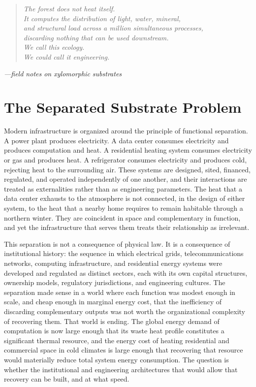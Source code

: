 \documentclass[12pt, oneside]{article}
\begin{document}
\begin{quote}
\small\itshape
The forest does not heat itself.\\
It computes the distribution of light, water, mineral,\\
and structural load across a million simultaneous processes,\\
discarding nothing that can be used downstream.\\
We call this ecology.\\
We could call it engineering.
\end{quote}
\vspace{0.4em}
\begin{flushright}
\small\itshape ---field notes on xylomorphic substrates
\end{flushright}

\vspace{1.5em}
\onehalfspacing

\section{The Separated Substrate Problem}

Modern infrastructure is organized around the principle of functional separation. A power plant produces electricity. A data center consumes electricity and produces computation and heat. A residential heating system consumes electricity or gas and produces heat. A refrigerator consumes electricity and produces cold, rejecting heat to the surrounding air. These systems are designed, sited, financed, regulated, and operated independently of one another, and their interactions are treated as externalities rather than as engineering parameters. The heat that a data center exhausts to the atmosphere is not connected, in the design of either system, to the heat that a nearby home requires to remain habitable through a northern winter. They are coincident in space and complementary in function, and yet the infrastructure that serves them treats their relationship as irrelevant.

This separation is not a consequence of physical law. It is a consequence of institutional history: the sequence in which electrical grids, telecommunications networks, computing infrastructure, and residential energy systems were developed and regulated as distinct sectors, each with its own capital structures, ownership models, regulatory jurisdictions, and engineering cultures. The separation made sense in a world where each function was modest enough in scale, and cheap enough in marginal energy cost, that the inefficiency of discarding complementary outputs was not worth the organizational complexity of recovering them. That world is ending. The global energy demand of computation is now large enough that its waste heat profile constitutes a significant thermal resource, and the energy cost of heating residential and commercial space in cold climates is large enough that recovering that resource would materially reduce total system energy consumption. The question is whether the institutional and engineering architectures that would allow that recovery can be built, and at what speed.
\end{document}
